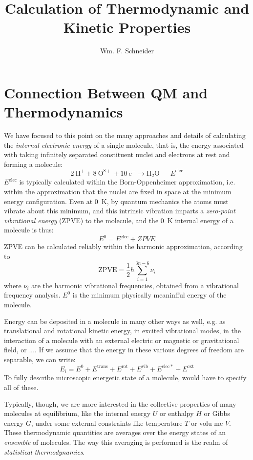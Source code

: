 \documentclass[11pt]{article}
\title{Calculation of Thermodynamic and Kinetic Properties}
\author{Wm. F. Schneider}
\begin{document}
\maketitle
\section{Connection Between QM and Thermodynamics}
We have focused to this point on the many approaches and details of calculating
the {\em internal electronic energy} of a single molecule, that is, the energy
associated with taking infinitely separated constituent nuclei and electrons at
rest and forming a molecule:
\begin{equation}
2~\mathrm{H}^+ + 8~\mathrm{O}^{8+} + 10~\mathrm{e}^- \rightarrow
\mathrm{H_2O}~~~~~~~E^\mathrm{elec}
\end{equation}
$E^\mathrm{elec}$ is typically calculated within the Born-Oppenheimer
approximation, i.e. within the approximation that the nuclei are fixed in space
at the minimum energy configuration.  Even at 0~K, by quantum mechanics the
atoms must vibrate about this minimum, and this intrinsic vibration imparts a
{\em zero-point vibrational energy} (ZPVE) to the molecule, and the 0~K
internal energy of a molecule is thus:
\begin{equation}
  E^0=E^\mathrm{elec} + ZPVE
\end{equation}
ZPVE can be calculated reliably within the harmonic approximation, according to
\begin{equation}
  \mathrm{ZPVE}=\frac{1}{2}h\sum_{i=1}^{3n-6}\nu_i
\end{equation}
where $\nu_i$ are the harmonic vibrational frequencies, obtained from a
vibrational frequency analysis.  $E^0$ is the minimum physically meaninfful
energy of the molecule.

Energy can be deposited in a molecule in many other ways as well, e.g. as
translational and rotational kinetic energy, in excited vibrational modes, in
the interaction of a molecule with an external electric or magnetic or
gravitational field, or ....  If we assume that the energy in these various
degrees of freedom are separable, we can write:
\begin{equation}
  E_i=E^0+E^\mathrm{trans}+E^\mathrm{rot}+E^\mathrm{vib} +E^\mathrm{elec*}+E^\mathrm{ext}
\end{equation}
To fully describe microscopic energetic state of a molecule, would have to
specify all of these.

Typically, though, we are more interested in the collective properties of many
molecules at equilibrium, like the internal energy $U$ or enthalpy $H$ or Gibbs
energy $G$, under some external constraints like temperature $T$ or volu
me $V$.  These thermodynamic quantities are averages over the energy states of
an {\em ensemble} of molecules.  The way this averaging is performed is the
realm of {\em statistical thermodynamics}.
\end{document}
